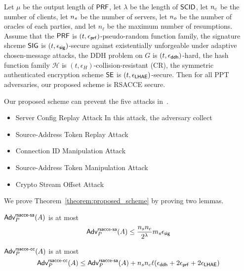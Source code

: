 \begin{theorem} \label{theorem:proposed_scheme}
 Let $\mu$ be the output length of $\mathsf{PRF}$, let $\lambda$ be
 the length of $\mathsf{SCID}$, let $n_c$ be the number of
 clients, let $n_s$ be the number of servers, let
 $n_o$ be the number of oracles of each parties, and
 let $n_{\ell}$ be the maximum number of resumptions. Assume
 that the $\mathsf{PRF}$ is $(t, \epsilon_{\mathsf{prf}})$-pseudo-random
 function family, the signature shceme
 $\mathsf{SIG}$ is $(t, \epsilon_{\mathsf{sig}})$-secure against existentially
 unforgeable under adaptive chosen-message attacks, the DDH
 problem on $G$ is $(t, \epsilon_{\mathsf{ddh}})$-hard, the hash
 function family $\mathcal{H}$ is
 $(t,\epsilon_{H})$-collision-resistant (CR), the symmetric
 authenticated encryption scheme $\mathsf{SE}$ is
 $(t, \epsilon_{\mathsf{LHAE}})$-secure.
 Then for all PPT adversaries, our proposed scheme is RSACCE secure.
\end{theorem}

Our proposed scheme can prevent the five attacks in~\cite{LJBN15:QUIC}.

\begin{itemize}
 \item{Server Config Replay Attack}
  In this attack, the adversary collect
 \item{Source-Address Token Replay Attack}
 \item{Connection ID Manipulation Attack}
 \item{Source-Address Token Manipulation Attack}
 \item{Crypto Stream Offset Attack}
\end{itemize}

We prove Theorem~\ref{theorem:proposed_scheme} by proving two lemmas.

\begin{lemma} \label{lemma:proposed_scheme_rsacce-sa}
 $\mathsf{Adv}^{\mathsf{rsacce\textsc{-} sa}}_{P}(A)$ is at most
 \begin{equation}
  \mathsf{Adv}^{\mathsf{rsacce\textsc{-} sa}}_{P}(A) \leq \frac{n_s n_c}{2^{\lambda}} m_s \epsilon_{\mathsf{sig}}
 \end{equation}
\end{lemma}
%


\begin{lemma} \label{lemma:proposed_scheme_rsacce-cc}
 $\mathsf{Adv}^{\mathsf{rsacce\textsc{-} cc}}_{P}(A)$ is at most
 \begin{equation}
  \mathsf{Adv}^{\mathsf{rsacce\textsc{-} cc}}_{P}(A) \leq \mathsf{Adv}^{\mathsf{rsacce\textsc{-} sa}}_{P}(A) + n_sn_c\ell(\epsilon_{\mathsf{ddh}} + 2\epsilon_{\mathsf{prf}} + 2\epsilon_{\mathsf{LHAE}})
 \end{equation}
\end{lemma}
%
